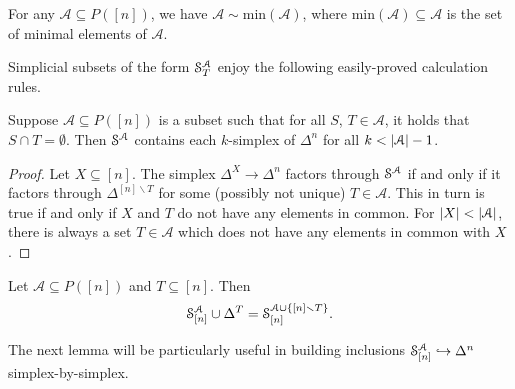 \documentclass[main.tex]{subfiles}
\begin{document}
\begin{lemma}
  \label{lemma:replace_poset_by_minimal_elements}
  For any $\mathcal{A} \subseteq P([n])$, we have $\mathcal{A} \sim \mathrm{min}(\mathcal{A})$, where $\mathrm{min}(\mathcal{A}) \subseteq \mathcal{A}$ is the set of minimal elements of $\mathcal{A}$.
\end{lemma}

Simplicial subsets of the form $\S^{\mathcal{A}}_{T}$ enjoy the following easily-proved calculation rules.

\begin{lemma}
  \label{lemma:subset_of_simplex_contains_k_simplices}
  Suppose $\mathcal{A} \subseteq P([n])$ is a subset such that for all $S$, $T \in \mathcal{A}$, it holds that $S \cap T = \emptyset$. Then $\S^{\mathcal{A}}$ contains each $k$-simplex of $\Delta^{n}$ for all $k < \abs{\mathcal{A}} - 1$.
\end{lemma}
\begin{proof}
  Let $X \subseteq [n]$. The simplex $\Delta^{X} \to \Delta^{n}$ factors through $\S^{\mathcal{A}}$ if and only if it factors through $\Delta^{[n] \smallsetminus T}$ for some (possibly not unique) $T \in \mathcal{A}$. This in turn is true if and only if $X$ and $T$ do not have any elements in common. For $\abs{X} < \abs{\mathcal{A}}$, there is always a set $T \in \mathcal{A}$ which does not have any elements in common with $X$.
\end{proof}

\begin{lemma}
  \label{lemma:add_a_simplex}
  Let $\mathcal{A} \subseteq P([n])$ and $T \subseteq [n]$. Then
  \begin{equation*}
    \S^{\mathcal{A}}_{[n]} \cup \Delta^{T} = \S^{\mathcal{A} \cup \{[n] \smallsetminus T\}}_{[n]}.
  \end{equation*}
\end{lemma}

The next lemma will be particularly useful in building inclusions $\S^{\mathcal{A}}_{[n]} \hookrightarrow \Delta^{n}$ simplex-by-simplex.
\end{document}
